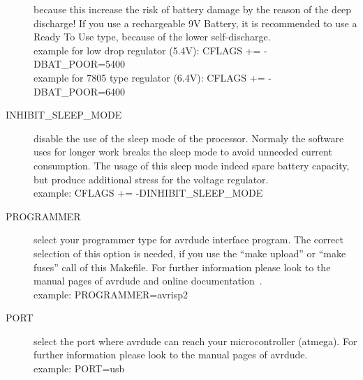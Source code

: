 \begin{description}
because this increase the risk of battery damage by the reason of the deep discharge!
If you use a rechargeable 9V Battery, it is recommended to use a Ready To Use type, because of the lower self-discharge.\\
example for low drop regulator (5.4V): CFLAGS += -DBAT\_POOR=5400\\
example for 7805 type regulator (6.4V): CFLAGS += -DBAT\_POOR=6400
  \item[INHIBIT\_SLEEP\_MODE] disable the use of the sleep mode of the processor.
Normaly the software uses for longer work breaks the sleep mode to avoid unneeded current consumption.
The usage of this sleep mode indeed spare battery capacity, but produce additional stress for the voltage regulator.\\
example: CFLAGS += -DINHIBIT\_SLEEP\_MODE

  \item[PROGRAMMER] select your programmer type for avrdude interface program.
The correct selection of this option is needed, if you use the ``make upload'' or ``make fuses'' call
of this Makefile.
For further information please look to the manual pages of avrdude and online documentation~\cite{avrdude}.\\
example: PROGRAMMER=avrisp2
  \item[PORT] select the port where avrdude can reach your microcontroller (atmega).
For further information please look to the manual pages of avrdude.\\
example: PORT=usb

\end{description}

